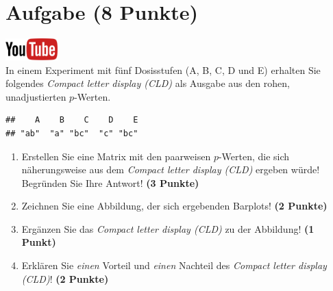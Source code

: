 \documentclass[a4paper, 10pt]{scrartcl}\usepackage[]{graphicx}\usepackage[]{xcolor}
\makeatletter
\newenvironment{kframe}{%
 \def\at@end@of@kframe{}%
 \ifinner\ifhmode%
  \def\at@end@of@kframe{\end{minipage}}%
  \begin{minipage}{\columnwidth}%
 \fi\fi%
 \def\FrameCommand##1{\hskip\@totalleftmargin \hskip-\fboxsep
 \colorbox{shadecolor}{##1}\hskip-\fboxsep
     \hskip-\linewidth \hskip-\@totalleftmargin \hskip\columnwidth}%
 \MakeFramed {\advance\hsize-\width
   \@totalleftmargin\z@ \linewidth\hsize
   \@setminipage}}%
 {\par\unskip\endMakeFramed%
 \at@end@of@kframe}
\newenvironment{knitrout}{}{} %
\makeatother
\begin{document}
 
\clearpage

\section{Aufgabe \hfill (8 Punkte)}


 \hfill\href{https://youtu.be/xq29O8qDrg0}{\includegraphics[width =
   2cm]{img/youtube}}\\[1Ex]


In einem Experiment mit f{\"u}nf Dosisstufen (A, B, C, D und E) erhalten Sie
folgendes \textit{Compact letter display (CLD)} als \Rlogo Ausgabe aus den rohen, unadjustierten $p$-Werten. 



\begin{knitrout}
\color{fgcolor}\begin{kframe}
\begin{verbatim}
##    A    B    C    D    E 
## "ab"  "a" "bc"  "c" "bc"
\end{verbatim}
\end{kframe}
\end{knitrout}

\begin{enumerate}
\item Erstellen Sie eine Matrix mit den paarweisen $p$-Werten, die sich
  n{\"a}herungsweise aus dem \textit{Compact letter display (CLD)} ergeben w{\"u}rde! Begr{\"u}nden Sie Ihre Antwort! \textbf{(3 Punkte)}
\item Zeichnen Sie eine Abbildung, der sich ergebenden Barplots! \textbf{(2 Punkte)}
\item Erg{\"a}nzen Sie das \textit{Compact letter display (CLD)} zu der
  Abbildung! \textbf{(1 Punkt)}
\item Erkl{\"a}ren Sie \textit{einen} Vorteil und \textit{einen} Nachteil des \textit{Compact letter display (CLD)}! \textbf{(2 Punkte)}
\end{enumerate}
\end{document}
